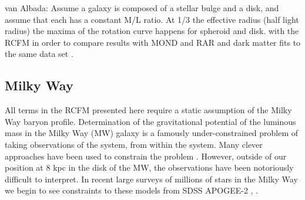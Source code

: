 \documentclass[reprint,%
 amsmath,amssymb,
 aps,
]{revtex4-1}
\begin{document}
 
   
 
 

 
 van Albada: Assume a galaxy is composed of a stellar bulge and a disk, and assume that each has a constant M/L ratio. At 1/3 the effective radius (half light radius) the maxima of the rotation curve happens for spheroid and disk. 
   with  the RCFM in order to compare results with    MOND and RAR and dark matter fits to the same data set   \cite{McGaugh_2014,Li_2018}. 


\subsection{Milky Way}
 
All terms in the RCFM presented here require a static assumption of the Milky Way  baryon profile. 
Determination of the gravitational potential of the luminous mass in the Milky Way (MW) galaxy is a famously under-constrained problem of   taking observations of the system, from within the system. Many clever approaches have been used to constrain the    problem \cite{1991ARA&A..29..409F}.
However, outside of our position at 8 kpc in the disk of the MW, the observations have been notoriously difficult to interpret. In  recent large surveys of millions of  stars in the Milky Way  we begin to see  constraints to these models from  SDSS APOGEE-2 \cite{2022ApJS..259...35A},  \cite{10.1093/mnras/stt814}.  
\end{document}
